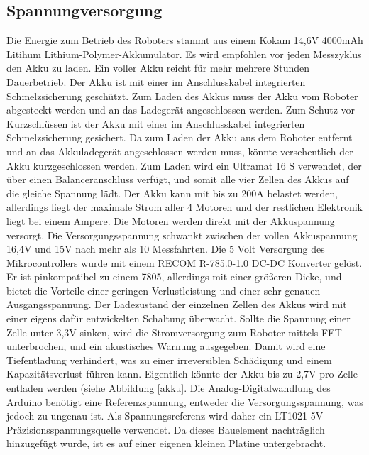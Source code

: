 \documentclass[a4paper,bibtotoc,oneside]{scrbook}
\begin{document}
\subsection{Spannungversorgung}\thispagestyle{empty}
Die Energie zum Betrieb des Roboters stammt aus einem Kokam 14,6V 4000mAh Litihum Lithium-Polymer-Akkumulator. Es wird empfohlen vor jeden Messzyklus den Akku zu laden. Ein voller Akku reicht für mehr mehrere Stunden Dauerbetrieb. Der Akku ist mit einer im Anschlusskabel integrierten Schmelzsicherung geschützt. Zum Laden des Akkus muss der Akku vom Roboter abgesteckt werden und an das Ladegerät angeschlossen werden. Zum Schutz vor Kurzschlüssen ist der Akku mit einer im Anschlusskabel integrierten Schmelzsicherung gesichert. Da zum Laden der Akku aus dem Roboter entfernt und an das Akkuladegerät angeschlossen werden muss, könnte versehentlich der Akku kurzgeschlossen werden. Zum Laden wird ein Ultramat 16 S verwendet, der über einen Balanceranschluss verfügt, und somit alle vier Zellen des Akkus auf die gleiche Spannung lädt. 
Der Akku kann mit bis zu 200A belastet werden, allerdings liegt der maximale Strom aller 4 Motoren und der restlichen Elektronik liegt bei einem Ampere. Die Motoren werden direkt mit der Akkuspannung versorgt. Die Versorgungsspannung schwankt zwischen der vollen Akkuspannung 16,4V und 15V nach mehr als 10 Messfahrten.
Die 5 Volt Versorgung des Mikrocontrollers wurde mit einem RECOM R-785.0-1.0 DC-DC Konverter gelöst. Er ist pinkompatibel zu einem 7805, allerdings mit einer größeren Dicke, und bietet die Vorteile einer geringen Verlustleistung und einer sehr genauen Ausgangsspannung. 
Der Ladezustand der einzelnen Zellen des Akkus wird mit einer eigens dafür entwickelten Schaltung überwacht. Sollte die Spannung einer Zelle unter 3,3V sinken, wird die Stromversorgung zum Roboter mittels FET unterbrochen, und ein akustisches Warnung ausgegeben. Damit wird eine Tiefentladung verhindert, was zu einer irreversiblen Schädigung und einem Kapazitätsverlust führen kann. Eigentlich könnte der Akku bis zu 2,7V pro Zelle entladen werden (siehe Abbildung \ref{akku}.
Die Analog-Digitalwandlung des Arduino benötigt eine Referenzspannung, entweder die Versorgungsspannung, was jedoch zu ungenau ist. Als Spannungsreferenz wird daher ein LT1021 5V Präzisionsspannungsquelle verwendet. Da dieses Bauelement nachträglich hinzugefügt wurde, ist es auf einer eigenen kleinen Platine untergebracht.

 
\end{document}
